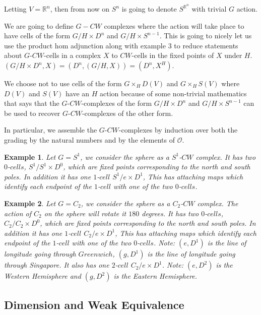 \documentclass{article}
\theoremstyle{problemstyle}
\theoremstyle{problemstyle}
\theoremstyle{problemstyle}
\newtheorem{example}{Example}
\theoremstyle{problemstyle}
\theoremstyle{problemstyle}
\theoremstyle{problemstyle}
\begin{document}
Letting $V = \mathbb{R}^n$, then from now on $S^n$ is going to denote $S^{\mathbb{R}^n}$ with trivial $G$ action.

We are going to define $G-CW$ complexes where the action will take place to have cells of the form $G/H \times D^n$ and $G/H \times S^{n-1}$. This is going to nicely let us use the product hom adjunction along with example 3 to reduce statements about $G$-$CW$-cells in a complex $X$ to $CW$-cells in the fixed points of $X$ under $H$.  $(G/H \times D^n, X) = (D^n, (G/H,X)) = (D^n, X^H)$. 

We choose not to use cells of the form $G\times_H D(V)$ and $G\times_H S(V)$ where $D(V)$ and $S(V)$ have an $H$ action because of some non-trivial mathematics that says that the $G$-$CW$-complexes of the form $G/H \times D^n$ and $G/H \times S^{n-1}$ can be used to recover $G$-$CW$-complexes of the other form. 

In particular, we assemble the $G$-$CW$-complexes by induction over both the grading by the natural numbers and by the elements of $\mathscr{O}$. 

\begin{example}
Let $G = S^1$, we consider the sphere as a $S^1$-$CW$ complex. It has two $0$-$cells$, $S^1/S^1 \times D^0$, which are fixed points corresponding to the north and south poles. In addition it has one $1$-$cell$ $S^1/{e}\times D^1$, This has attaching maps which identify each endpoint of the $1$-$cell$ with one of the two $0$-$cells$. 
\end{example}

\begin{example}
Let $G = C_2$, we consider the sphere as a $C_2$-$CW$ complex. The action of $C_2$ on the sphere will rotate it $180$ degrees. It has two $0$-$cells$, $C_2/C_2 \times D^0$, which are fixed points corresponding to the north and south poles. In addition it has one $1$-$cell$ $C_2/{e}\times D^1$, This has attaching maps which identify each endpoint of the $1$-$cell$ with one of the two $0$-$cells$. Note: $(e,D^1)$ is the line of longitude going through $Greenwich$, $(g,D^1)$ is the line of longitude going through Singapore.  It also has one $2$-$cell$ $C_2/{e}\times D^1$. Note: $(e,D^2)$ is the Western Hemisphere and $(g,D^2)$ is the Eastern Hemisphere.
\end{example}

\subsection{Dimension and Weak Equivalence}
\end{document}
